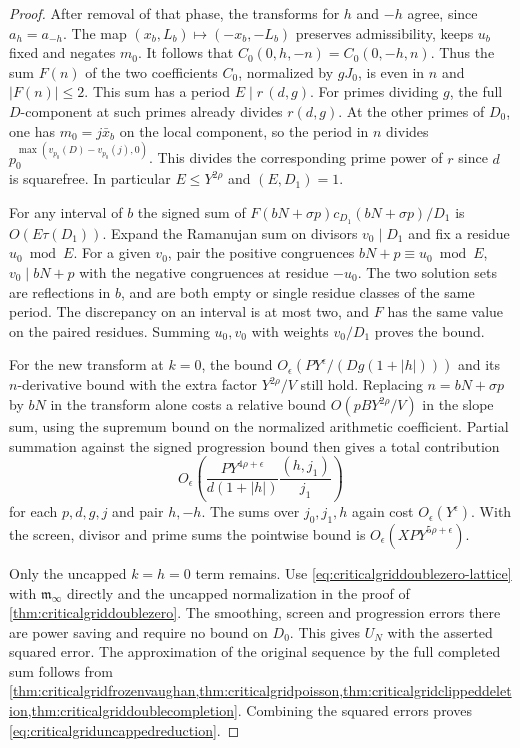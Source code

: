 \documentclass[11pt,a4paper]{article}
\numberwithin{equation}{section}
\begin{document}
\begin{proof}
After removal of that phase, the transforms for
$h$ and $-h$ agree, since $a_h=a_{-h}$.
The map $(x_b,L_b)\mapsto(-x_b,-L_b)$ preserves
admissibility, keeps $u_b$ fixed and negates $m_0$.
It follows that $C_0(0,h,-n)=C_0(0,-h,n)$.
Thus the sum $F(n)$ of the two coefficients $C_0$,
normalized by $gJ_0$, is even in $n$ and $|F(n)|\le2$.
This sum has a period $E\mid r\,(d,g)$.
For primes dividing $g$, the full $D$-component at
such primes already divides $r(d,g)$. At the other
primes of $D_0$, one has $m_0=j\bar x_b$ on the
local component, so the period in $n$ divides
$p_0^{\max(v_{p_0}(D)-v_{p_0}(j),0)}$.
This divides the corresponding prime power of $r$
since $d$ is squarefree. In particular $E\le Y^{2\rho}$
and $(E,D_1)=1$.

For any interval of $b$ the signed sum of
$F(bN+\sigma p)c_{D_1}(bN+\sigma p)/D_1$ is
$O(E\tau(D_1))$. Expand the Ramanujan sum on divisors
$v_0\mid D_1$ and fix a residue $u_0\bmod E$.
For a given $v_0$, pair the positive congruences
$bN+p\equiv u_0\bmod E$, $v_0\mid bN+p$ with
the negative congruences at residue $-u_0$.
The two solution sets are reflections in $b$,
and are both empty or single residue classes of
the same period. The discrepancy on an interval
is at most two, and $F$ has the same value on the
paired residues. Summing $u_0,v_0$ with weights
$v_0/D_1$ proves the bound.

For the new transform at $k=0$, the bound
$O_\epsilon(PY^\epsilon/(Dg(1+|h|)))$ and its
$n$-derivative bound with the extra factor $Y^{2\rho}/V$
still hold. Replacing $n=bN+\sigma p$ by $bN$
in the transform alone costs a relative bound
$O(pB Y^{2\rho}/V)$ in the slope sum, using the
supremum bound on the normalized arithmetic coefficient.
Partial summation against the signed progression
bound then gives a total contribution
\[
 O_\epsilon\!\left(
 \frac{P Y^{4\rho+\epsilon}}{d(1+|h|)}
                \frac{(h,j_1)}{j_1}\right)
\]
for each $p,d,g,j$ and pair $h,-h$.
The sums over $j_0,j_1,h$ again cost
$O_\epsilon(Y^\epsilon)$. With the screen, divisor and
prime sums the pointwise bound is
$O_\epsilon(XP Y^{5\rho+\epsilon})$.

Only the uncapped $k=h=0$ term remains. Use
\cref{eq:criticalgriddoublezero-lattice} with
$\mathfrak m_\infty$ directly and the uncapped
normalization in the proof of
\cref{thm:criticalgriddoublezero}.
The smoothing, screen and progression errors there
are power saving and require no bound on $D_0$.
This gives $U_N$ with the asserted squared error.
The approximation of the original sequence by the
full completed sum follows from
\cref{thm:criticalgridfrozenvaughan,thm:criticalgridpoisson,thm:criticalgridclippeddeletion,thm:criticalgriddoublecompletion}.
Combining the squared errors proves
\cref{eq:criticalgriduncappedreduction}.
\end{proof}
\end{document}
